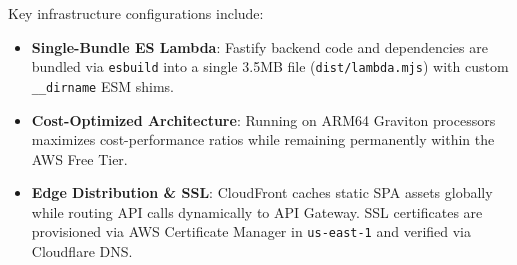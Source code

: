 Key infrastructure configurations include:
\begin{itemize}
    \item \textbf{Single-Bundle ES Lambda}: Fastify backend code and dependencies are bundled via \texttt{esbuild} into a single 3.5MB file (\texttt{dist/lambda.mjs}) with custom \texttt{\_\_dirname} ESM shims.
    \item \textbf{Cost-Optimized Architecture}: Running on ARM64 Graviton processors maximizes cost-performance ratios while remaining permanently within the AWS Free Tier.
    \item \textbf{Edge Distribution \& SSL}: CloudFront caches static SPA assets globally while routing API calls dynamically to API Gateway. SSL certificates are provisioned via AWS Certificate Manager in \texttt{us-east-1} and verified via Cloudflare DNS.
\end{itemize}

